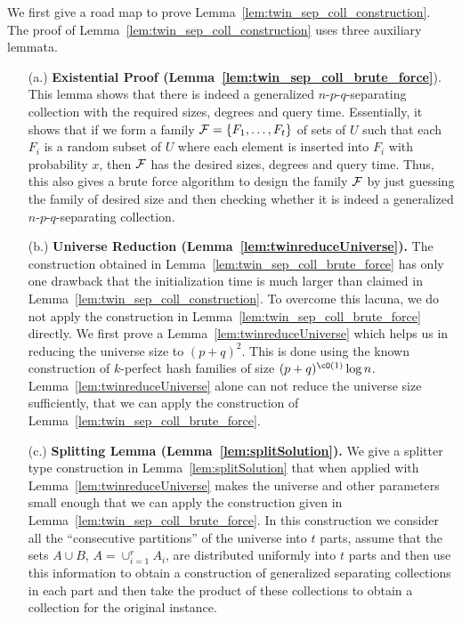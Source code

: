 We first give a road map to prove Lemma~\ref{lem:twin_sep_coll_construction}. 
The proof of  Lemma~\ref{lem:twin_sep_coll_construction} uses three auxiliary lemmata. 
\begin{enumerate}
\item[(a.)] {\bf Existential Proof (Lemma~\ref{lem:twin_sep_coll_brute_force}}). This lemma shows that there is indeed a 
generalized $n$-$p$-$q$-separating collection with the required sizes, degrees and query time. Essentially, it shows that if we form a family  ${\cal F}=\{F_1,\ldots,F_t\}$ of sets of $U$ such that each $F_i$ is a random subset of $U$ where each element  is inserted into $F_i$ with probability $x$, then ${\cal F}$ has the desired sizes, degrees and query time. Thus, this also gives a brute force algorithm to design the family $\cal F$ by just guessing the family of desired size and then checking whether it is indeed  a generalized $n$-$p$-$q$-separating collection. 
\item[(b.)]  {\bf Universe Reduction (Lemma~\ref{lem:twinreduceUniverse}).} The construction obtained in Lemma~\ref{lem:twin_sep_coll_brute_force} 
has only one drawback that the initialization time is much larger than claimed in Lemma~\ref{lem:twin_sep_coll_construction}. To overcome this lacuna, we do not apply the construction in Lemma~\ref{lem:twin_sep_coll_brute_force} directly. 
We first prove a Lemma~\ref{lem:twinreduceUniverse} which helps us in reducing the universe size to $(p+q)^2$. This is done using the  known construction of $k$-perfect hash families of size $(p+q)^{\cO(1)} \log n$. 
Lemma~\ref{lem:twinreduceUniverse} alone  can not reduce the universe size sufficiently, that we can apply the construction of Lemma~\ref{lem:twin_sep_coll_brute_force}. 
\item[(c.)] {\bf Splitting Lemma (Lemma~\ref{lem:splitSolution}).} We give a splitter type construction in Lemma~\ref{lem:splitSolution} that when applied with 
Lemma~\ref{lem:twinreduceUniverse} makes the universe and other parameters small enough that we can apply the construction given in 
Lemma~\ref{lem:twin_sep_coll_brute_force}. In this construction we consider all the ``consecutive partitions''  of the universe into $t$ parts, assume that the sets $A\cup B$, $A=\cup_{i=1}^r A_i$, are distributed uniformly into $t$ parts and then use this information to obtain a construction of generalized separating collections in each part and then take the product of these collections to obtain a collection for the original instance.
\end{enumerate}

